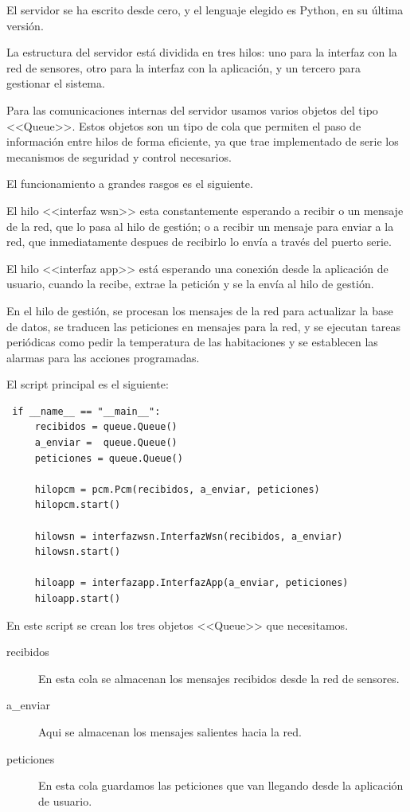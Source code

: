  El servidor se ha escrito desde cero, y el lenguaje elegido es Python, en su última versión. 
 
 La estructura del servidor está dividida en tres hilos: uno para la interfaz con la red de sensores, otro para la interfaz con la aplicación, y un tercero para gestionar el sistema. 
 
 
 Para las comunicaciones internas del servidor usamos varios objetos del tipo <<Queue>>. Estos objetos son un tipo de cola que permiten el paso de información entre hilos de forma eficiente, ya que trae implementado de serie los mecanismos de seguridad y control necesarios.
 
 El funcionamiento a grandes rasgos es el siguiente. 
 
 El hilo <<interfaz wsn>> esta constantemente esperando a recibir o un mensaje de la red, que lo pasa al hilo de gestión; o a recibir un mensaje para enviar a la red, que inmediatamente despues de recibirlo lo envía a través del puerto serie.
 
 El hilo <<interfaz app>> está esperando una conexión desde la aplicación de usuario, cuando la recibe, extrae la petición y se la envía al hilo de gestión.
 
 En el hilo de gestión, se procesan los mensajes de la red para actualizar la base de datos, se traducen las peticiones en mensajes para la red, y se ejecutan tareas periódicas como pedir la temperatura de las habitaciones y se establecen las alarmas para las acciones programadas.
 
 El script principal es el siguiente:
 \begin{lstlisting}
 if __name__ == "__main__":
     recibidos = queue.Queue()
     a_enviar =  queue.Queue()
     peticiones = queue.Queue()
 
     hilopcm = pcm.Pcm(recibidos, a_enviar, peticiones)
     hilopcm.start()
 
     hilowsn = interfazwsn.InterfazWsn(recibidos, a_enviar)
     hilowsn.start()
 
     hiloapp = interfazapp.InterfazApp(a_enviar, peticiones)
     hiloapp.start()
 \end{lstlisting}
 
 En este script se crean los tres objetos <<Queue>> que necesitamos.
 \begin{description}
     \item[recibidos] En esta cola se almacenan los mensajes recibidos desde la red de sensores.
     \item[a\_enviar] Aqui se almacenan los mensajes salientes hacia la red.
     \item[peticiones] En esta cola guardamos las peticiones que van llegando desde la aplicación de usuario.
    \end{description}
 
